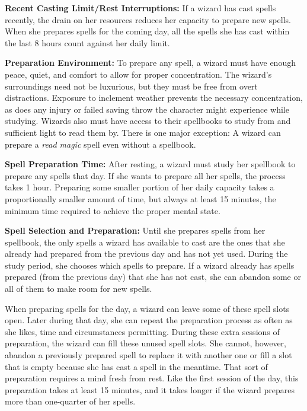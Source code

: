 \documentclass{article}
\begin{document}
\textbf{Recent Casting Limit/Rest Interruptions:} If a wizard has cast spells recently, 
the drain on her resources reduces her capacity to prepare new spells. When she 
prepares spells for the coming day, all the spells she has cast within the last 
8 hours count against her daily limit.

\textbf{Preparation Environment:} To prepare any spell, a wizard must have enough 
peace, quiet, and comfort to allow for proper concentration. The wizard's surroundings 
need not be luxurious, but they must be free from overt distractions. Exposure 
to inclement weather prevents the necessary concentration, as does any injury or 
failed saving throw the character might experience while studying. Wizards also 
must have access to their spellbooks to study from and sufficient light to read 
them by. There is one major exception: A wizard can prepare a \textit{read magic 
}spell even without a spellbook. 

\textbf{Spell Preparation Time:} After resting, a wizard must study her spellbook 
to prepare any spells that day. If she wants to prepare all her spells, the process 
takes 1 hour. Preparing some smaller portion of her daily capacity takes a proportionally 
smaller amount of time, but always at least 15 minutes, the minimum time required 
to achieve the proper mental state.

\textbf{Spell Selection and Preparation:} Until she prepares spells from her spellbook, 
the only spells a wizard has available to cast are the ones that she already had 
prepared from the previous day and has not yet used. During the study period, she 
chooses which spells to prepare. If a wizard already has spells prepared (from 
the previous day) that she has not cast, she can abandon some or all of them to 
make room for new spells.

When preparing spells for the day, a wizard can leave some of these spell slots 
open. Later during that day, she can repeat the preparation process as often as 
she likes, time and circumstances permitting. During these extra sessions of preparation, 
the wizard can fill these unused spell slots. She cannot, however, abandon a previously 
prepared spell to replace it with another one or fill a slot that is empty because 
she has cast a spell in the meantime. That sort of preparation requires a mind 
fresh from rest. Like the first session of the day, this preparation takes at least 
15 minutes, and it takes longer if the wizard prepares more than one-quarter of 
her spells.
\end{document}
